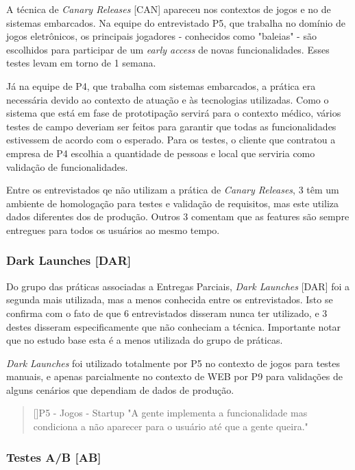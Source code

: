 A técnica de \emph{Canary Releases} [CAN] apareceu nos contextos de jogos e no de sistemas embarcados. Na equipe do entrevistado P5, que trabalha no domínio de jogos eletrônicos, os principais jogadores - conhecidos como "baleias" - são escolhidos para participar de um \emph{early access} de novas funcionalidades.  Esses testes levam em torno de 1 semana. 

Já na equipe de P4, que trabalha com sistemas embarcados, a prática era necessária devido ao contexto de atuação e às tecnologias utilizadas. Como o sistema que está em fase de prototipação servirá para o contexto médico, vários testes de campo deveriam ser feitos para garantir que todas as funcionalidades estivessem de acordo com o esperado. Para os testes, o cliente que contratou a empresa de P4 escolhia a quantidade de pessoas e local que serviria como validação de funcionalidades.

Entre os entrevistados qe não utilizam a prática de \emph{Canary Releases}, 3 têm um ambiente de homologação para testes e validação de requisitos, mas este utiliza dados diferentes dos de produção. Outros 3 comentam que as features são sempre entregues para todos os usuários ao mesmo tempo.


\subsubsection{Dark Launches [DAR]}

Do grupo das práticas associadas a Entregas Parciais, \emph{Dark Launches} [DAR] foi a segunda mais utilizada, mas a menos conhecida entre os entrevistados. Isto se confirma com o fato de que 6 entrevistados disseram nunca ter utilizado, e 3 destes disseram especificamente que não conheciam a técnica. Importante notar que no estudo base \cite{empiricalStudy2016} esta é a menos utilizada do grupo de práticas.

\emph{Dark Launches} foi utilizado totalmente por P5 no contexto de jogos para testes manuais, e apenas parcialmente no contexto de WEB por P9 para validações de alguns cenários que dependiam de dados de produção.


\begin{quotation}[]{P5 - Jogos - Startup}
    "A gente implementa a funcionalidade mas condiciona a não aparecer para o usuário até que a gente queira."
\end{quotation}

\subsubsection{Testes A/B [AB]}

